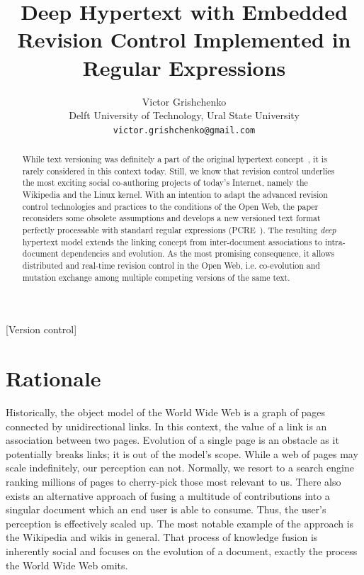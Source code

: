 \documentclass{sig-alternate}
\date{}
\begin{document}

\title{Deep Hypertext with Embedded Revision Control Implemented in Regular Expressions}

\author{Victor Grishchenko \\ \small Delft University of Technology, Ural State University \\ {\tt victor.grishchenko@gmail.com} }

\maketitle

\begin{abstract}
While text versioning was definitely a part of the original hypertext concept~\cite{nls,literary,hyp-ed-sys}, it is rarely considered in this context today.
Still, we know that revision control underlies the most exciting social co-authoring projects of today's Internet, namely the Wikipedia and the Linux kernel.
With an intention to adapt the advanced revision control technologies and practices to the conditions of the Open Web, the paper reconsiders some obsolete assumptions and develops a new versioned text format perfectly processable with standard regular expressions (PCRE~\cite{pcre}).
The resulting \emph{deep} hypertext model extends the linking concept from inter-document associations to intra-document dependencies and evolution.
As the most promising consequence, it allows distributed and real-time revision control in the Open Web, i.e. co-evolution and mutation exchange among multiple competing versions of the same text. 

\end{abstract}

[Version control]

\section{Rationale}

Historically, the object model of the World Wide Web is a graph of pages connected by unidirectional links.
In this context, the value of a link is an association between two pages.
Evolution of a single page is an obstacle as it potentially breaks links; it is out of the model’s scope.
While a web of pages may scale indefinitely, our perception can not. 
Normally, we resort to a search engine ranking millions of pages to cherry-pick those most relevant to us.
There also exists an alternative approach of fusing a multitude of contributions into a singular document which an end user is able to consume.
Thus, the user's perception is effectively scaled up.
The most notable example of the approach is the Wikipedia and wikis in general.
That process of knowledge fusion is inherently social and focuses on the evolution of a document, exactly the process the World Wide Web omits.
\end{document}
